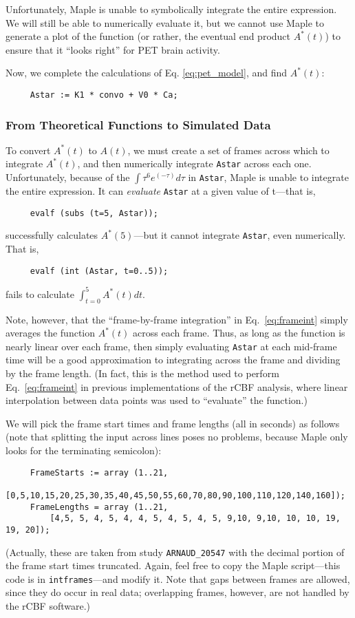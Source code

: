 \documentclass[11pt]{article}
\begin{document}
Unfortunately, Maple is unable to symbolically integrate the entire
expression.  We will still be able to numerically evaluate it, but we
cannot use Maple to generate a plot of the function (or rather, the
eventual end product $A^{*}(t)$) to ensure that it ``looks right'' for PET
brain activity.

Now, we complete the calculations of Eq. \ref{eq:pet_model}, and find
$A^{*}(t)$:
\begin{verbatim}
     Astar := K1 * convo + V0 * Ca;
\end{verbatim}

\subsubsection{From Theoretical Functions to Simulated Data}

To convert $A^{*}(t)$ to $A(t)$, we must create a set of frames across
which to integrate $A^{*}(t)$, and then numerically integrate
\verb|Astar| across each one.  Unfortunately, because of the $\int
\tau^{6} e^{(-\tau)} d\tau$ in \verb|Astar|, Maple is unable to integrate
the entire expression.  It can {\em evaluate} \verb|Astar| at a given
value of t---that is, 
\begin{verbatim}
     evalf (subs (t=5, Astar));
\end{verbatim}
successfully calculates $A^{*} (5)$---but it cannot integrate
\verb|Astar|, even numerically.  That is,
\begin{verbatim}
     evalf (int (Astar, t=0..5));
\end{verbatim}
fails to calculate $\int_{t=0}^{5} A^{*} (t) dt$.

Note, however, that the ``frame-by-frame integration'' in
Eq.~\ref{eq:frameint} simply averages the function $A^{*}(t)$ across
each frame.  Thus, as long as the function is nearly linear over each
frame, then simply evaluating \verb|Astar| at each mid-frame time will
be a good approximation to integrating across the frame and dividing
by the frame length.  (In fact, this is the method used to perform
Eq.~\ref{eq:frameint} in previous implementations of the rCBF
analysis, where linear interpolation between data points was used to
``evaluate'' the function.)

We will pick the frame start times and frame lengths (all in seconds)
as follows (note that splitting the input across lines poses no
problems, because Maple only looks for the terminating semicolon):
\begin{verbatim}
     FrameStarts := array (1..21, 
         [0,5,10,15,20,25,30,35,40,45,50,55,60,70,80,90,100,110,120,140,160]);
     FrameLengths = array (1..21, 
         [4,5, 5, 4, 5, 4, 4, 5, 4, 5, 4, 5, 9,10, 9,10, 10, 10, 19, 19, 20]);
\end{verbatim}
(Actually, these are taken from study \verb|ARNAUD_20547| with the
decimal portion of the frame start times truncated.  Again, feel free
to copy the Maple script---this code is in \verb|intframes|---and
modify it.  Note that gaps between frames are allowed, since they do
occur in real data; overlapping frames, however, are not handled by
the rCBF software.)
\end{document}
